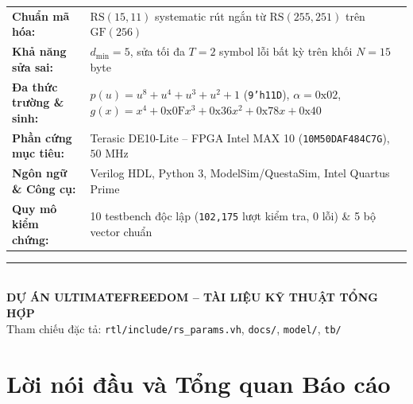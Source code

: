 \documentclass[12pt,a4paper]{report}
\begin{document}
\begin{titlepage}
    \begin{tcolorbox}[
        width=0.88\textwidth,
        colback=boxbg,
        colframe=primaryblue,
        boxrule=0.8pt,
        arc=4pt,
        left=10pt,
        right=10pt,
        top=8pt,
        bottom=8pt
    ]
        \small
        \renewcommand{\arraystretch}{1.25}
        \begin{tabularx}{\linewidth}{@{}>{\bfseries\color{primaryblue}}l X@{}}
            Chuẩn mã hóa: & $\text{RS}(15,11)$ systematic rút ngắn từ $\text{RS}(255,251)$ trên $\text{GF}(256)$ \\
            Khả năng sửa sai: & $d_{\min} = 5$, sửa tối đa $T = 2$ symbol lỗi bất kỳ trên khối $N = 15$ byte \\
            Đa thức trường \& sinh: & $p(u) = u^8 + u^4 + u^3 + u^2 + 1$ (\texttt{9'h11D}), $\alpha = \text{0x02}$, $g(x) = x^4 + \text{0x0F}x^3 + \text{0x36}x^2 + \text{0x78}x + \text{0x40}$ \\
            Phần cứng mục tiêu: & Terasic DE10-Lite -- FPGA Intel MAX 10 (\texttt{10M50DAF484C7G}), $50\text{ MHz}$ \\
            Ngôn ngữ \& Công cụ: & Verilog HDL, Python 3, ModelSim/QuestaSim, Intel Quartus Prime \\
            Quy mô kiểm chứng: & 10 testbench độc lập (\texttt{102,175} lượt kiểm tra, 0 lỗi) \& 5 bộ vector chuẩn
        \end{tabularx}
    \end{tcolorbox}

    \vfill
    \rule{0.45\textwidth}{0.5pt}\\[0.3cm]
    {\normalsize\bfseries\color{primaryblue} DỰ ÁN ULTIMATEFREEDOM -- TÀI LIỆU KỸ THUẬT TỔNG HỢP}\\[0.15cm]
    {\small\color{mutedgray} Tham chiếu đặc tả: \texttt{rtl/include/rs\_params.vh}, \texttt{docs/}, \texttt{model/}, \texttt{tb/}}
    \vspace*{0.6cm}
\end{titlepage}


\chapter*{Lời nói đầu và Tổng quan Báo cáo}
\end{document}
